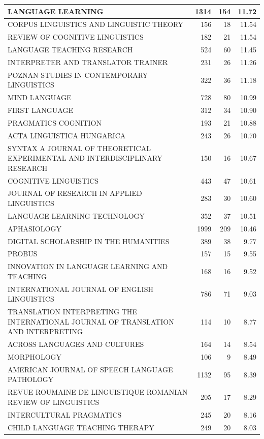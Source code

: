 \documentclass[]{elsarticle} %
\begin{document}
\begin{table}
\begin{tabular}[t]{l|r|r|r}
\hline
LANGUAGE LEARNING & 1314 & 154 & 11.72\\
\hline
CORPUS LINGUISTICS AND LINGUISTIC THEORY & 156 & 18 & 11.54\\
\hline
REVIEW OF COGNITIVE LINGUISTICS & 182 & 21 & 11.54\\
\hline
LANGUAGE TEACHING RESEARCH & 524 & 60 & 11.45\\
\hline
INTERPRETER AND TRANSLATOR TRAINER & 231 & 26 & 11.26\\
\hline
POZNAN STUDIES IN CONTEMPORARY LINGUISTICS & 322 & 36 & 11.18\\
\hline
MIND LANGUAGE & 728 & 80 & 10.99\\
\hline
FIRST LANGUAGE & 312 & 34 & 10.90\\
\hline
PRAGMATICS COGNITION & 193 & 21 & 10.88\\
\hline
ACTA LINGUISTICA HUNGARICA & 243 & 26 & 10.70\\
\hline
SYNTAX A JOURNAL OF THEORETICAL EXPERIMENTAL AND INTERDISCIPLINARY RESEARCH & 150 & 16 & 10.67\\
\hline
COGNITIVE LINGUISTICS & 443 & 47 & 10.61\\
\hline
JOURNAL OF RESEARCH IN APPLIED LINGUISTICS & 283 & 30 & 10.60\\
\hline
LANGUAGE LEARNING TECHNOLOGY & 352 & 37 & 10.51\\
\hline
APHASIOLOGY & 1999 & 209 & 10.46\\
\hline
DIGITAL SCHOLARSHIP IN THE HUMANITIES & 389 & 38 & 9.77\\
\hline
PROBUS & 157 & 15 & 9.55\\
\hline
INNOVATION IN LANGUAGE LEARNING AND TEACHING & 168 & 16 & 9.52\\
\hline
INTERNATIONAL JOURNAL OF ENGLISH LINGUISTICS & 786 & 71 & 9.03\\
\hline
TRANSLATION INTERPRETING THE INTERNATIONAL JOURNAL OF TRANSLATION AND INTERPRETING & 114 & 10 & 8.77\\
\hline
ACROSS LANGUAGES AND CULTURES & 164 & 14 & 8.54\\
\hline
MORPHOLOGY & 106 & 9 & 8.49\\
\hline
AMERICAN JOURNAL OF SPEECH LANGUAGE PATHOLOGY & 1132 & 95 & 8.39\\
\hline
REVUE ROUMAINE DE LINGUISTIQUE ROMANIAN REVIEW OF LINGUISTICS & 205 & 17 & 8.29\\
\hline
INTERCULTURAL PRAGMATICS & 245 & 20 & 8.16\\
\hline
CHILD LANGUAGE TEACHING THERAPY & 249 & 20 & 8.03\\

\end{tabular}
\end{table}
\end{document}
